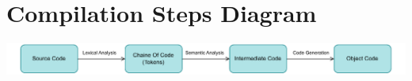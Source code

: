 \vspace{1cm}
\section{Compilation Steps Diagram}

\vspace{0.3cm}
\begin{center}
    \includegraphics[height=0.08\textheight]{Chapters/Examples/Intro/sum.drawio.pdf}
\end{center}




